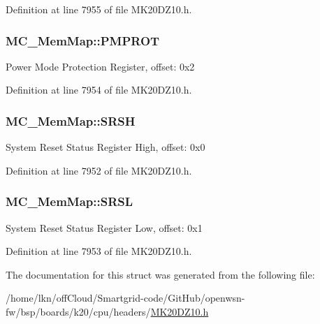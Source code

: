 Definition at line 7955 of file M\+K20\+D\+Z10.\+h.

\subsubsection[{\texorpdfstring{P\+M\+P\+R\+OT}{PMPROT}}]{ M\+C\+\_\+\+Mem\+Map\+::\+P\+M\+P\+R\+OT}\hypertarget{struct_m_c___mem_map_a757aa627fdb6c7a5b724ddf9ca47afdb}{}\label{struct_m_c___mem_map_a757aa627fdb6c7a5b724ddf9ca47afdb}
Power Mode Protection Register, offset\+: 0x2 

Definition at line 7954 of file M\+K20\+D\+Z10.\+h.

\subsubsection[{\texorpdfstring{S\+R\+SH}{SRSH}}]{ M\+C\+\_\+\+Mem\+Map\+::\+S\+R\+SH}\hypertarget{struct_m_c___mem_map_afcccae19489d29a8edafec4f949b33d2}{}\label{struct_m_c___mem_map_afcccae19489d29a8edafec4f949b33d2}
System Reset Status Register High, offset\+: 0x0 

Definition at line 7952 of file M\+K20\+D\+Z10.\+h.

\subsubsection[{\texorpdfstring{S\+R\+SL}{SRSL}}]{ M\+C\+\_\+\+Mem\+Map\+::\+S\+R\+SL}\hypertarget{struct_m_c___mem_map_a30d9c6061830ab2b5eb71ce3a31e0f33}{}\label{struct_m_c___mem_map_a30d9c6061830ab2b5eb71ce3a31e0f33}
System Reset Status Register Low, offset\+: 0x1 

Definition at line 7953 of file M\+K20\+D\+Z10.\+h.



The documentation for this struct was generated from the following file\+:\begin{DoxyCompactItemize}
\item 
/home/lkn/off\+Cloud/\+Smartgrid-\/code/\+Git\+Hub/openwsn-\/fw/bsp/boards/k20/cpu/headers/\hyperlink{_m_k20_d_z10_8h}{M\+K20\+D\+Z10.\+h}\end{DoxyCompactItemize}
